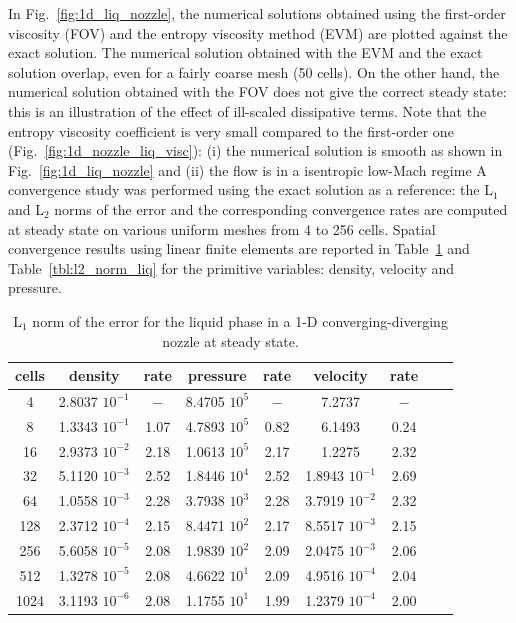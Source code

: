 \documentclass[preprint,10pt]{elsarticle}
\newcommand{\fig}[1]{Fig.~\ref{#1}}                      %
\newcommand{\tbl}[1]{Table~\ref{#1}}                     %
\begin{document}
%
In \fig{fig:1d_liq_nozzle}, the numerical solutions obtained using the first-order viscosity (FOV) and the entropy 
viscosity method (EVM) are plotted against the exact solution. The numerical solution obtained with the EVM and the 
exact solution overlap, even for a fairly coarse mesh (50 cells).
On the other hand, the numerical solution obtained with the FOV does not give the correct steady state: this is an 
illustration of the effect of ill-scaled dissipative terms. 
%
Note that the entropy viscosity coefficient is very small compared to the first-order one (\fig{fig:1d_nozzle_liq_visc}): 
(i) the numerical solution is smooth as shown in \fig{fig:1d_liq_nozzle} and (ii) the flow is in a isentropic low-Mach regime 
A convergence study was performed using the exact solution as a reference: the L$_1$ and L$_2$ norms of the 
error and the corresponding convergence rates are computed at steady state on various uniform meshes from 4 to 256 cells.
Spatial convergence results using linear finite elements are reported in \tbl{tbl:l1_norm_liq} and \tbl{tbl:l2_norm_liq} 
for the primitive variables: density, velocity and pressure.
%
\begin{table}[H]
\begin{center}
 \caption{\label{tbl:l1_norm_liq} L$_1$ norm of the error for the liquid phase in a 1-D converging-diverging nozzle at steady state.}
 \begin{tabular}{|c|c|c|c|c|c|c|c|c|}
 \hline
cells & density         & rate   & pressure        & rate    & velocity         & rate     \\ \hline
4    & 2.8037 $10^{-1}$ & $-$    & 8.4705 $10^{5}$ & $-$     & 7.2737           & $-$      \\ \hline
8    & 1.3343 $10^{-1}$ & 1.07 & 4.7893 $10^{5}$ & 0.82 & 6.1493           & 0.24 \\ \hline
16   & 2.9373 $10^{-2}$ & 2.18 & 1.0613 $10^{5}$ & 2.17  & 1.2275           & 2.32   \\ \hline
32   & 5.1120 $10^{-3}$ & 2.52 & 1.8446 $10^{4}$ & 2.52  & 1.8943 $10^{-1}$ & 2.69   \\ \hline
64   & 1.0558 $10^{-3}$ & 2.28 & 3.7938 $10^{3}$ & 2.28  & 3.7919 $10^{-2}$ & 2.32   \\ \hline
128  & 2.3712 $10^{-4}$ & 2.15 & 8.4471 $10^{2}$ & 2.17  & 8.5517 $10^{-3}$ & 2.15   \\ \hline
256  & 5.6058 $10^{-5}$ & 2.08 & 1.9839 $10^{2}$ & 2.09  & 2.0475 $10^{-3}$ & 2.06   \\ \hline
512  & 1.3278 $10^{-5}$ & $2.08$ & 4.6622 $10^{1}$ & 2.09  & 4.9516 $10^{-4}$ & $2.04$   \\ \hline
1024  & 3.1193 $10^{-6}$ & $2.08$ & 1.1755 $10^{1}$ & 1.99  & 1.2379 $10^{-4}$ & 2.00   \\ \hline
\end{tabular}
\end{center}
\end{table}
\end{document}
